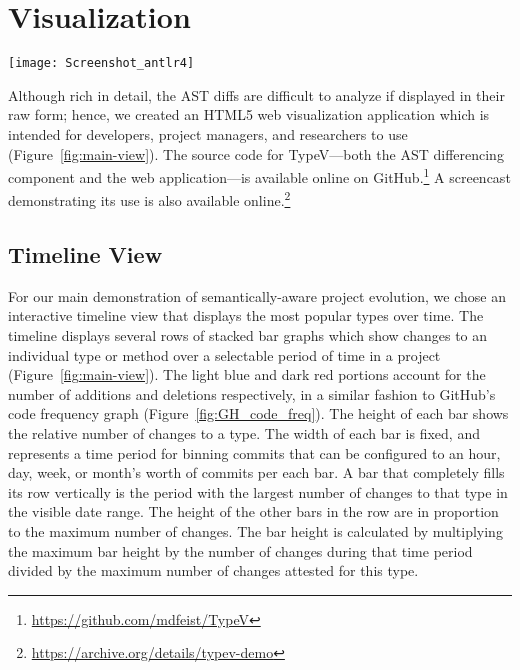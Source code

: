 \section{Visualization}



\label{sec:viz}

\begin{figure*}[!ht]
\centering
\texttt{[image: Screenshot\_antlr4]}
\caption{Screenshot showing the main view for TypeV. The data being displayed is from the ANTLR4 repository. Light blue bars \additionsbox{10pt} indicate \textbf{additions}; dark red bars \deletionsbox{10pt} indicate \textbf{deletions}.}
\label{fig:main-view}
\end{figure*}

Although rich in detail, the AST diffs are difficult to analyze if displayed in their raw form; hence, we created an HTML5 web visualization application which is intended for developers, project managers, and researchers to use (Figure~\ref{fig:main-view}). The source code for TypeV---both the AST differencing component and the web application---is available online on GitHub.\footnote{\url{https://github.com/mdfeist/TypeV}} A screencast demonstrating its use is also available online.\footnote{\url{https://archive.org/details/typev-demo}}

\subsection{Timeline View}
For our main demonstration of semantically-aware project evolution, we chose an interactive timeline view that displays the most popular types over time. The timeline displays several rows of stacked bar graphs which show changes to an individual type or method over a selectable period of time in a project (Figure~\ref{fig:main-view}). The light blue \additionsbox{10pt} and dark red \deletionsbox{10pt} portions account for the number of additions and deletions respectively, in a similar fashion to GitHub's code frequency graph (Figure~\ref{fig:GH_code_freq}). The height of each bar shows the relative number of changes to a type. The width of each bar is fixed, and represents a time period for binning commits that can be configured to an hour, day, week, or month's worth of commits per each bar. A bar that completely fills its row vertically is the period with the largest number of changes to that type in the visible date range. The height of the other bars in the row are in proportion to the maximum number of changes. The bar height is calculated by multiplying the maximum bar height by the number of changes during that time period divided by the maximum number of changes attested for this type.

